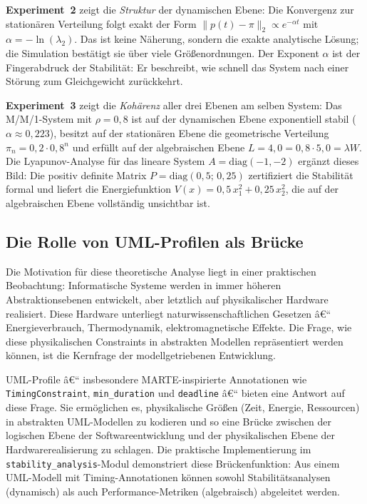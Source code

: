 ﻿\documentclass[a4paper,12pt]{report}
\theoremstyle{definition}
\begin{document}
\textbf{Experiment~2} zeigt die \emph{Struktur} der dynamischen Ebene:
Die Konvergenz zur stationären Verteilung folgt exakt der Form
$\|p(t) - \pi\|_2 \propto e^{-\alpha t}$ mit $\alpha = -\ln(\lambda_2)$.
Das ist keine Näherung, sondern die exakte analytische Lösung; die
Simulation bestätigt sie über viele Größenordnungen.  Der Exponent $\alpha$
ist der Fingerabdruck der Stabilität: Er beschreibt, wie schnell das System
nach einer Störung zum Gleichgewicht zurückkehrt.

\textbf{Experiment~3} zeigt die \emph{Kohärenz} aller drei Ebenen am selben
System: Das M/M/1-System mit $\rho = 0{,}8$ ist auf der dynamischen Ebene
exponentiell stabil ($\alpha \approx 0{,}223$), besitzt auf der stationären
Ebene die geometrische Verteilung $\pi_n = 0{,}2 \cdot 0{,}8^n$ und erfüllt
auf der algebraischen Ebene $L = 4{,}0 = 0{,}8 \cdot 5{,}0 = \lambda W$.
Die Lyapunov-Analyse für das lineare System $A = \text{diag}(-1,-2)$
ergänzt dieses Bild: Die positiv definite Matrix $P = \text{diag}(0{,}5;\,
0{,}25)$ zertifiziert die Stabilität formal und liefert die Energiefunktion
$V(x) = 0{,}5\,x_1^2 + 0{,}25\,x_2^2$, die auf der algebraischen Ebene
vollständig unsichtbar ist.

\subsection{Die Rolle von UML-Profilen als Brücke}

Die Motivation für diese theoretische Analyse liegt in einer praktischen
Beobachtung: Informatische Systeme werden in immer höheren
Abstraktionsebenen entwickelt, aber letztlich auf physikalischer Hardware
realisiert.  Diese Hardware unterliegt naturwissenschaftlichen Gesetzen â€“
Energieverbrauch, Thermodynamik, elektromagnetische Effekte.  Die Frage,
wie diese physikalischen Constraints in abstrakten Modellen repräsentiert
werden können, ist die Kernfrage der modellgetriebenen Entwicklung.

UML-Profile â€“ insbesondere MARTE-inspirierte Annotationen wie
\texttt{TimingConstraint}, \texttt{min\_duration} und \texttt{deadline} â€“
bieten eine Antwort auf diese Frage.  Sie ermöglichen es, physikalische
Größen (Zeit, Energie, Ressourcen) in abstrakten UML-Modellen zu kodieren
und so eine Brücke zwischen der logischen Ebene der Softwareentwicklung
und der physikalischen Ebene der Hardwarerealisierung zu schlagen.  Die
praktische Implementierung im \texttt{stability\_analysis}-Modul
demonstriert diese Brückenfunktion: Aus einem UML-Modell mit
Timing-Annotationen können sowohl Stabilitätsanalysen (dynamisch) als auch
Performance-Metriken (algebraisch) abgeleitet werden.
\end{document}
